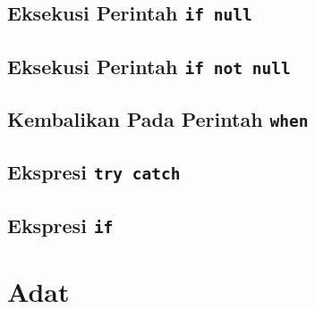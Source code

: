 \subsection{Eksekusi Perintah \texttt{if null}}
\subsection{Eksekusi Perintah \texttt{if not null}}
\subsection{Kembalikan Pada Perintah \texttt{when}}
\subsection{Ekspresi \texttt{try catch}}
\subsection{Ekspresi \texttt{if}}

\section{Adat}